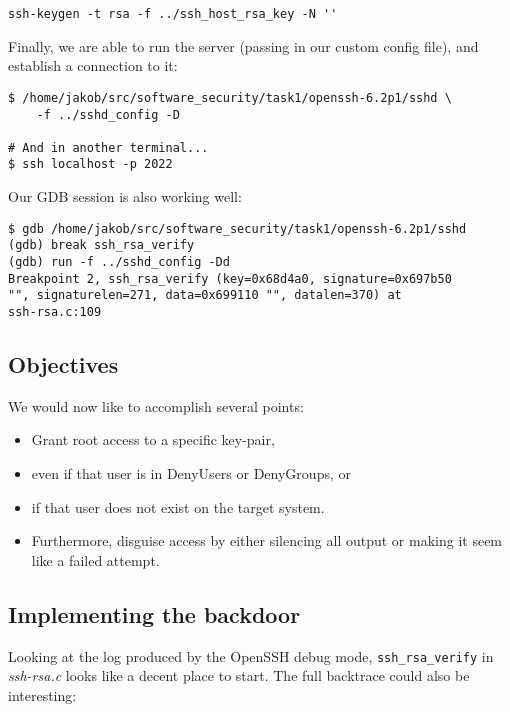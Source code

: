 \documentclass[a4paper,10pt]{article}
\begin{document}
\begin{verbatim}
ssh-keygen -t rsa -f ../ssh_host_rsa_key -N ''
\end{verbatim}

Finally, we are able to run the server (passing in our custom config file),
and establish a connection to it:

\begin{verbatim}
$ /home/jakob/src/software_security/task1/openssh-6.2p1/sshd \
    -f ../sshd_config -D
    
# And in another terminal...
$ ssh localhost -p 2022
\end{verbatim}

Our GDB session is also working well:

\begin{verbatim}
$ gdb /home/jakob/src/software_security/task1/openssh-6.2p1/sshd
(gdb) break ssh_rsa_verify
(gdb) run -f ../sshd_config -Dd
Breakpoint 2, ssh_rsa_verify (key=0x68d4a0, signature=0x697b50
"", signaturelen=271, data=0x699110 "", datalen=370) at 
ssh-rsa.c:109
\end{verbatim}

\subsection{Objectives}

We would now like to accomplish several points:

\begin{itemize}
\item Grant root access to a specific key-pair, 
\item even if that user is in DenyUsers or DenyGroups, or
\item if that user does not exist on the target system.
\item Furthermore, disguise access by either silencing all
      output or making it seem like a failed attempt.
\end{itemize}

\subsection{Implementing the backdoor}

Looking at the log produced by the OpenSSH debug mode, \lstinline|ssh_rsa_verify|
in \emph{ssh-rsa.c} looks like a decent place to start. The full backtrace
could also be interesting:
\end{document}

